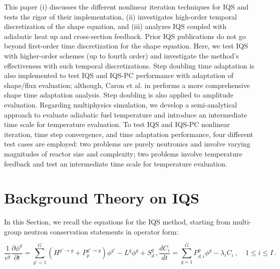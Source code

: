 \documentclass{elsarticle}
\newcommand{\iqspc}{IQS-PC\xspace}
\newcommand{\be}{\begin{equation}}
\newcommand{\ee}{\end{equation}}
\begin{document}
This paper (i) discusses the different nonlinear iteration techniques for IQS and tests the rigor of their implementation, (ii) investigates high-order temporal discretization of the shape equation, and (iii) analyzes IQS coupled with adiabatic heat up and cross-section feedback. Prior IQS publications do not go beyond first-order time discretization for the shape equation. Here, we test IQS with higher-order schemes (up to fourth order) and investigate the method's effectiveness with such temporal discretizations. Step doubling time adaptation is also implemented to test IQS and \iqspc performance with adaptation of shape/flux evaluation; although, Caron et al. in \cite{caron2017} performs a more comprehensive shape time adaptation analysis. Step doubling is also applied to amplitude evaluation. Regarding multiphysics simulation, we develop a semi-analytical approach to evaluate adiabatic fuel temperature and introduce an intermediate time scale for temperature evaluation. To test IQS and \iqspc nonlinear iteration, time step convergence, and time adaptation performance, four different test cases are employed: two problems are purely neutronics and involve varying magnitudes of reactor size and complexity; two problems involve temperature feedback and test an intermediate time scale for temperature evaluation.

\section{Background Theory on IQS}

In this Section, we recall the equations for the IQS method, starting from multi-group neutron conservation statements in operator form:

\begin{subequations}
\be
\frac{1}{v^g}\frac{\partial \phi^g}{\partial t} = \sum_{g'=1}^G \left(H^{g'\to g} + P_p^{g' \to g} \right) \phi^{g'} - L^g\phi^g + S_{d}^g \,,
\label{eq:flux}
\ee 
\be
\frac{dC_i}{dt} = \sum_{g=1}^G P_{d,i}^g \phi^{g} - \lambda_i C_i \ , \quad 1 \le i \le I  \,.
\label{eq:precursor}
\ee
\end{subequations}
\end{document}
